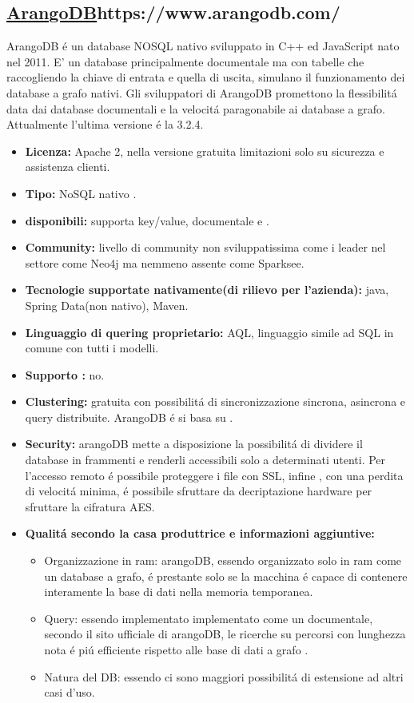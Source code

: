 \subsection{\url{ArangoDB}{https://www.arangodb.com/}}
ArangoDB \'e un database NOSQL nativo  sviluppato in C++ ed JavaScript nato nel 2011. E' un database principalmente documentale ma con tabelle che raccogliendo la chiave di entrata e quella di uscita, simulano il funzionamento dei database a grafo nativi. Gli sviluppatori di ArangoDB promettono la flessibilit\'a data dai database documentali e la velocit\'a paragonabile ai database a grafo.\\
Attualmente l'ultima versione \'e la 3.2.4.
\begin{itemize}
\item \textbf{Licenza:} Apache 2, nella versione gratuita limitazioni solo su sicurezza e assistenza clienti.
\item \textbf{Tipo:} NoSQL nativo .
\item \textbf{ disponibili:} supporta key/value, documentale e .
\item \textbf{Community:} livello di community non sviluppatissima come i leader nel settore come Neo4j ma nemmeno assente come Sparksee.
\item \textbf{Tecnologie supportate nativamente(di rilievo per l'azienda):} java, Spring Data(non nativo), Maven.
\item\textbf{Linguaggio di quering proprietario:} AQL, linguaggio simile ad SQL in comune con tutti i modelli.
\item\textbf{Supporto :} no.

\item\textbf{Clustering:} gratuita con possibilit\'a di sincronizzazione sincrona, asincrona e query distribuite. ArangoDB \'e si basa su .
\item\textbf{Security:} arangoDB mette a disposizione la possibilit\'a di dividere il database in frammenti e renderli accessibili solo a determinati utenti. Per l'accesso remoto \'e possibile proteggere i file con SSL, infine , con una perdita di velocit\'a minima, \'e possibile sfruttare da decriptazione hardware per sfruttare la cifratura AES. 
\item\textbf{Qualit\'a secondo la casa produttrice e informazioni aggiuntive:} 
\begin{itemize}
\item{Organizzazione in ram:} arangoDB, essendo organizzato solo in ram come un database a grafo, \'e prestante solo se la macchina \'e capace di contenere interamente la base di dati nella memoria temporanea.
\item{Query:} essendo implementato implementato come un documentale, secondo il sito ufficiale di arangoDB, le ricerche su percorsi con lunghezza nota \'e pi\'u efficiente rispetto alle base di dati a grafo .
\item{Natura del DB:} essendo  ci sono maggiori possibilit\'a di estensione ad altri casi d'uso.
\end{itemize}
\end{itemize}


